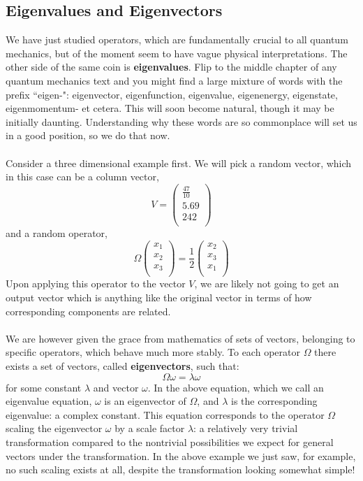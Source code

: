 \subsection{Eigenvalues and Eigenvectors}
We have just studied operators, which are fundamentally crucial to all quantum mechanics, but of the moment seem to have vague physical interpretations. The other side of the same coin is \textbf{eigenvalues}. Flip to the middle chapter of any quantum mechanics text and you might find a large mixture of words with the prefix ``eigen-": eigenvector, eigenfunction, eigenvalue, eigenenergy, eigenstate, eigenmomentum- et cetera. This will soon become natural, though it may be initially daunting. Understanding why these words are so commonplace will set us in a good position, so we do that now.
\\\\
Consider a three dimensional example first. We will pick a random vector, which in this case can be a column vector, 
$$
V=\begin{pmatrix}
\frac{47}{10}\\
5.69\\
242\\
\end{pmatrix}
$$
and a random operator, 
$$
\Omega \begin{pmatrix}
x_{1}\\
x_{2}\\
x_{3}\\
\end{pmatrix}=\frac{1}{2}\begin{pmatrix}
x_{2}\\
x_{3}\\
x_{1}\\
\end{pmatrix}
$$
Upon applying this operator to the vector $V$, we are likely not going to get an output vector which is anything like the original vector in terms of how corresponding components are related.
\\\\
We are however given the grace from mathematics of sets of vectors, belonging to specific operators, which behave much more stably. To each operator $\Omega$ there exists a set of vectors, called \textbf{eigenvectors}, such that:
$$
\Omega\omega = \lambda\omega
$$
for some constant $\lambda$ and vector $\omega$. In the above equation, which we call an eigenvalue equation, $\omega$ is an eigenvector of $\Omega$, and $\lambda$ is the corresponding eigenvalue: a complex constant. This equation corresponds to the operator $\Omega$ scaling the eigenvector $\omega$ by a scale factor $\lambda$: a relatively very trivial transformation compared to the nontrivial possibilities we expect for general vectors under the transformation. In the above example we just saw, for example, no such scaling exists at all, despite the transformation looking somewhat simple!
